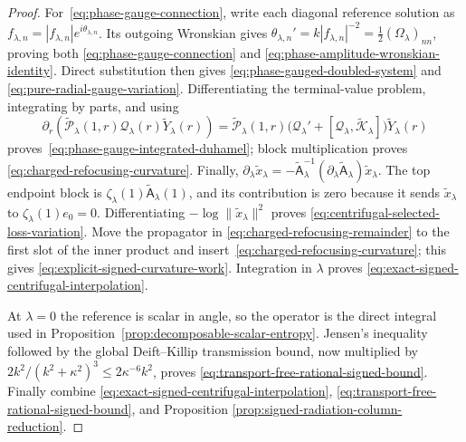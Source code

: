 \documentclass[11pt]{article}
\theoremstyle{definition}
\theoremstyle{remark}
\begin{document}
\begin{proof}
For~\eqref{eq:phase-gauge-connection}, write each diagonal reference solution
as $f_{\lambda,n}=|f_{\lambda,n}|e^{i\theta_{\lambda,n}}$.  Its outgoing
Wronskian gives
$\theta_{\lambda,n}'=k|f_{\lambda,n}|^{-2}
=\frac12(\Omega_\lambda)_{nn}$, proving both
\eqref{eq:phase-gauge-connection} and
\eqref{eq:phase-amplitude-wronskian-identity}.  Direct substitution then gives
\eqref{eq:phase-gauged-doubled-system} and
\eqref{eq:pure-radial-gauge-variation}.  Differentiating the terminal-value
problem, integrating by parts, and using
\begin{equation*}
 \partial_r\!\left(
  \widetilde{\mathcal P}_\lambda(1,r)\mathcal Q_\lambda(r)
  \widetilde Y_\lambda(r)\right)
 =\widetilde{\mathcal P}_\lambda(1,r)
  \bigl(\mathcal Q_\lambda'
       +[\mathcal Q_\lambda,\widetilde{\mathcal K}_\lambda]\bigr)
  \widetilde Y_\lambda(r)
\end{equation*}
proves~\eqref{eq:phase-gauge-integrated-duhamel}; block multiplication proves
\eqref{eq:charged-refocusing-curvature}.  Finally,
$\partial_\lambda\widetilde x_\lambda
=-\widetilde{\mathsf A}_\lambda^{-1}
(\partial_\lambda\widetilde{\mathsf A}_\lambda)\widetilde x_\lambda$.
The top endpoint block is
$\zeta_\lambda(1)\widetilde{\mathsf A}_\lambda(1)$, and its contribution is
zero because it sends $\widetilde x_\lambda$ to
$\zeta_\lambda(1)e_0=0$.  Differentiating
$-\log\|\widetilde x_\lambda\|^2$ proves
\eqref{eq:centrifugal-selected-loss-variation}.  Move the propagator in
\eqref{eq:charged-refocusing-remainder} to the first slot of the inner product
and insert~\eqref{eq:charged-refocusing-curvature}; this gives
\eqref{eq:explicit-signed-curvature-work}.  Integration in $\lambda$ proves
\eqref{eq:exact-signed-centrifugal-interpolation}.

At $\lambda=0$ the reference is scalar in angle, so the operator is the direct
integral used in Proposition~\ref{prop:decomposable-scalar-entropy}.  Jensen's
inequality followed by the global Deift--Killip transmission bound, now
multiplied by
$2k^2/(k^2+\kappa^2)^3\leq2\kappa^{-6}k^2$, proves
\eqref{eq:transport-free-rational-signed-bound}.  Finally combine
\eqref{eq:exact-signed-centrifugal-interpolation},
\eqref{eq:transport-free-rational-signed-bound}, and Proposition
\ref{prop:signed-radiation-column-reduction}.
\end{proof}
\end{document}
